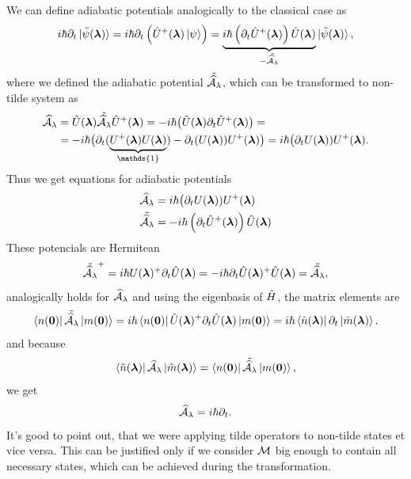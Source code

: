 We can define adiabatic potentials analogically to the classical case as
\begin{equation}
    i\hbar\partial_t \ket{\tilde{\psi}(\llambda)} = i\hbar \partial_t\left(\U^+(\llambda)\ket{\psi} \right)= \underbrace{i\hbar\left(\partial_t \U^+(\llambda)\right)\U(\llambda)}_{-\tilde{\AA_\lambda}}\ket{\tilde{\psi}(\llambda)},
\end{equation}
where we defined the adiabatic potential $\tilde{\AA_\lambda}$, which can be transformed to non-tilde system as
\begin{equation}
    \begin{split}
        \AA_\lambda&=\U(\llambda)\tilde{\AA_\lambda}\U^+(\llambda) = -i\hbar\big(\U(\llambda)\partial_t \U^+(\llambda)\big) =\\
        &= -i\hbar\big(\partial_t(\underbrace{U^+(\llambda)U(\llambda)}_{\mathds{1}})-\partial_t(U(\llambda))U^+(\llambda) \big) =i\hbar \big(\partial_t U(\llambda))U^+(\llambda).
    \end{split}
\end{equation}
Thus we get equations for adiabatic potentials
\begin{align}
    \AA_\lambda&=i\hbar \big(\partial_t U(\llambda))U^+(\llambda)
    \label{eq:adiabaticPotential}\\
    \tilde{\AA_\lambda} &= -i\hbar\left(\partial_t \U^+(\llambda)\right)\U(\llambda)
    \label{eq:adiabaticPotentialTilde}
\end{align}
These potencials are Hermitean
\begin{equation}
     \tilde{\AA_\lambda}^+=i\hbar U(\llambda)^+\partial_t\U(\llambda)=-i\hbar\partial_t\U(\llambda)^+\U(\llambda) = \tilde{\AA_\lambda} ,
\end{equation}
analogically holds for $\AA_\lambda$ and using the eigenbasis of $\HH$, the matrix elements are
\begin{equation}
    \bra{n(\bm 0)}\tilde{\AA_\lambda}\ket{m(\bm 0)}=i\hbar\bra{n(\bm 0)}\U(\llambda)^+\partial_t\U(\llambda)\ket{m(\bm 0)} = i\hbar\bra{\tilde n(\llambda)}\partial_t\ket{\tilde m(\llambda)}.
\end{equation}
and because
\begin{equation}
    \bra{\tilde n(\llambda)}\AA_\lambda\ket{\tilde m(\llambda)}= \bra{n(\bm 0)}\tilde{\AA_\lambda}\ket{m(\bm 0)},
\end{equation}
we get
\begin{equation}
    \AA_\lambda = i\hbar\partial_t.
    \label{eq:adiabaticPotentialDefinition}
\end{equation}
It's good to point out, that we were applying tilde operators to non-tilde states et vice versa. This can be justified only if we consider $\M$ big enough to contain all necessary states, which can be achieved during the transformation.


